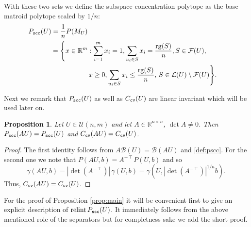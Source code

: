 \documentclass[11pt, a4paper, twoside, reqno]{amsart}
\DeclareMathOperator*{\rg}{rg}
\newcommand{\R}{\mathbb{R}}
\newtheorem{proposition}[theorem]{Proposition}
\theoremstyle{definition}
\theoremstyle{remark}
\newcommand{\scc}{{\tt scc}}
\newcommand{\cv}{{\tt cv}}
\DeclareMathOperator{\relint}{relint}
\numberwithin{equation}{section}
\begin{document}
With these two sets we define the subspace concentration polytope as
the base matroid polytope scaled by $1/n$: 
\begin{equation}
  \begin{split}
    P_\scc (U)= \frac{1}{n}  P(M_U) \\
              =\Biggl\{ x \in \R^m & : \sum_{i = 1}^m x_i = 1, \sum_{u_i \in S }  x_i = \frac{\rg(S)}{n},  S \in \mathcal{F}(U), \\
    &\, x\geq 0, \sum_{u_i \in  S }  x_i \leq \frac{\rg(S)}{n},\,  S \in
    \mathcal{L}(U) \setminus \mathcal{F}(U) \Biggl\}.
  \end{split}
  \label{def:pscc}
\end{equation}

Next we remark that $P_\scc(U)$ as well as $C_\cv(U)$ are
linear invariant which will be used later on.
\begin{proposition}
\label{prop:linearInvariant}Let $U\in\mathcal{U}(n,m)$ and let
  $A\in\R^{n\times n}$, $\det A\ne 0$.  Then
  $P_\scc(AU)=P_\scc(U)$ and $C_\cv(AU)=C_\cv(U)$.
\label{prop:invariant}
\end{proposition}
\begin{proof} The first identity follows from
  $A\mathcal{B}(U)=\mathcal{B}(AU)$ and \eqref{def:pscc}.
  For the second one we note that
$P(AU,b)=A^{-\intercal}P(U,b)$
and so
\begin{equation*}
  \gamma(AU,b)=|\det(A^{-\intercal})|\,\gamma(U,b)=\gamma(U,
  |\det(A^{-\intercal})|^{1/n}b).
\end{equation*}
Thus, $C_\cv(AU)=C_\cv(U)$.
\end{proof}

For the proof of Proposition \ref{prop:main} it will be convenient
first to give an explicit description of $\relint P_\scc(U)$. It
immediately follows from the above mentioned role of
the separators but for completness sake we add the short proof.
\end{document}
